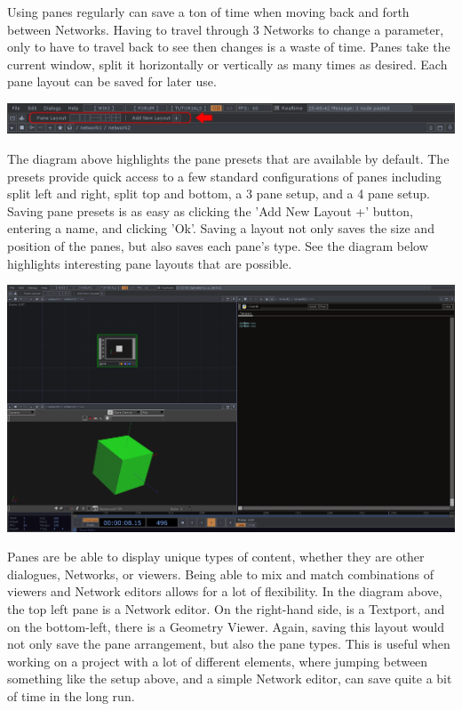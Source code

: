 \begin{fullwidth}

Using panes regularly can save a ton of time when moving back and forth between Networks. Having to travel through 3 Networks to change a parameter, only to have to travel back to see then changes is a waste of time. Panes take the current window, split it horizontally or vertically as many times as desired. Each pane layout can be saved for later use. 

\begin{center}
\includegraphics{./img/2.5/panes-1.png}
\end{center}

The diagram above highlights the pane presets that are available by default. The presets provide quick access to a few standard configurations of panes including split left and right, split top and bottom, a 3 pane setup, and a 4 pane setup. Saving pane presets is as easy as clicking the 'Add New Layout +' button, entering a name, and clicking 'Ok'. Saving a layout not only saves the size and position of the panes, but also saves each pane's type. See the diagram below highlights interesting pane layouts that are possible.

\begin{center}
\includegraphics{./img/2.5/panes-2.png}
\end{center}

Panes are be able to display unique types of content, whether they are other dialogues, Networks, or viewers. Being able to mix and match combinations of viewers and Network editors allows for a lot of flexibility. In the diagram above, the top left pane is a Network editor. On the right-hand side, is a Textport, and on the bottom-left, there is a Geometry Viewer. Again, saving this layout would not only save the pane arrangement, but also the pane types. This is useful when working on a project with a lot of different elements, where jumping between something like the setup above, and a simple Network editor, can save quite a bit of time in the long run.


\end{fullwidth}
